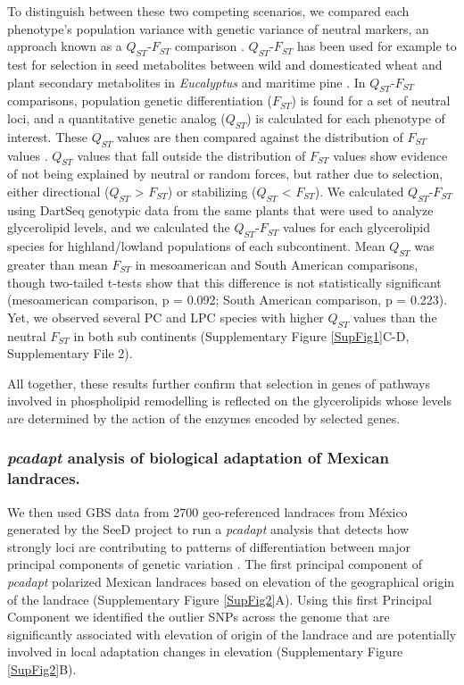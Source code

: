 \documentclass[9pt,twocolumn,twoside]{BioRxiv}
\begin{document}
To distinguish between these two competing scenarios, we compared each phenotype's population variance with genetic variance of neutral markers, an approach known as a $Q_{ST}$-$F_{ST}$ comparison \citep{Leinonen2013-ic}.
$Q_{ST}$-$F_{ST}$ has been used for example to test for selection in seed metabolites between wild and domesticated wheat \citep{Beleggia2016-xw} and plant secondary metabolites in \textit{Eucalyptus} \citep{o2013chemical} and maritime pine \citep{lopez2019genetic}.
In $Q_{ST}$-$F_{ST}$ comparisons, population genetic differentiation ($F_{ST}$) is found for a set of neutral loci, and a quantitative genetic analog ($Q_{ST}$) is calculated for each phenotype of interest.
These $Q_{ST}$ values are then compared against the distribution of $F_{ST}$ values \citep{whitlock2008evolutionary}.
$Q_{ST}$ values that fall outside the distribution of $F_{ST}$ values show evidence of not being explained by neutral or random forces, but rather due to selection, either directional ($Q_{ST}$ > $F_{ST}$) or stabilizing ($Q_{ST}$ < $F_{ST}$).
We calculated $Q_{ST}$-$F_{ST}$ using DartSeq genotypic data from the same plants that were used to analyze glycerolipid levels, and we calculated the $Q_{ST}$-$F_{ST}$ values for each glycerolipid species for highland/lowland populations of each subcontinent. 
Mean $Q_{ST}$ was greater than mean $F_{ST}$ in mesoamerican and South American comparisons, though two-tailed t-tests show that this difference is not statistically significant (mesoamerican comparison, p = 0.092; South American comparison, p = 0.223).
Yet, we observed several PC and LPC species with higher $Q_{ST}$ values than the neutral $F_{ST}$ in both sub continents (Supplementary Figure \ref{SupFig1}C-D, Supplementary File 2).

All together, these results further confirm that selection in genes of pathways involved in phospholipid remodelling is reflected on the glycerolipids whose levels are determined by the action of the enzymes encoded by selected genes.
\subsubsection{\textit{pcadapt} analysis of biological adaptation of Mexican landraces.} 
We then used GBS data from 2700 geo-referenced landraces from México generated by the SeeD project \citep{Romero_Navarro2017-cn, Gates2019-xu} to run a \textit{pcadapt} analysis that detects how strongly loci are contributing to patterns of differentiation between major principal components of genetic variation \citep{Luu2017-ws}.
The first principal component of \textit{pcadapt} polarized Mexican landraces based on elevation of the geographical origin of the landrace (Supplementary Figure \ref{SupFig2}A).
Using this first Principal Component we identified the outlier SNPs across the genome that are significantly associated with elevation of origin of the landrace and are potentially involved in local adaptation changes in elevation (Supplementary Figure \ref{SupFig2}B). 
\end{document}
